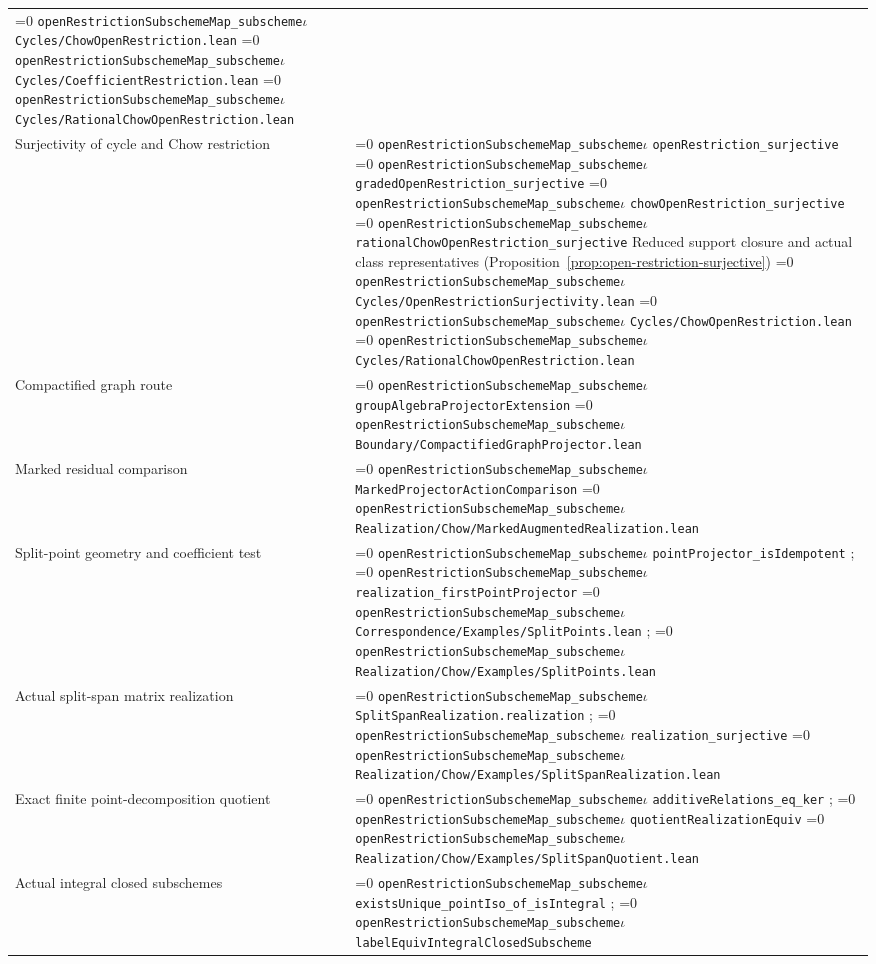 \documentclass[11pt]{article}
\theoremstyle{definition}
\theoremstyle{remark}
\newcommand{\leanpath}[1]{%
  \ifnum\pdfstrcmp{\detokenize{#1}}%
      {\detokenize{openRestrictionSubschemeMap_subschemeι}}=0
    \texttt{\nolinkurl{openRestrictionSubschemeMap_subscheme}}\ensuremath{\iota}%
  \else
    \texttt{\nolinkurl{#1}}%
  \fi}
\begin{document}
\begin{longtable}{@{}>{\raggedright\arraybackslash}p{}
                >{\raggedright\arraybackslash}p{}@{}}
\leanpath{Cycles/ChowOpenRestriction.lean}\newline
\leanpath{Cycles/CoefficientRestriction.lean}\newline
\leanpath{Cycles/RationalChowOpenRestriction.lean}\\
Surjectivity of cycle and Chow restriction &
\leanpath{openRestriction_surjective}\newline
\leanpath{gradedOpenRestriction_surjective}\newline
\leanpath{chowOpenRestriction_surjective}\newline
\leanpath{rationalChowOpenRestriction_surjective}\newline
Reduced support closure and actual class representatives
(Proposition~\ref{prop:open-restriction-surjective})\newline
\leanpath{Cycles/OpenRestrictionSurjectivity.lean}\newline
\leanpath{Cycles/ChowOpenRestriction.lean}\newline
\leanpath{Cycles/RationalChowOpenRestriction.lean}\\
Compactified graph route &
\leanpath{groupAlgebraProjectorExtension}\newline
\leanpath{Boundary/CompactifiedGraphProjector.lean}\\
Marked residual comparison &
\leanpath{MarkedProjectorActionComparison}\newline
\leanpath{Realization/Chow/MarkedAugmentedRealization.lean}\\
Split-point geometry and coefficient test &
\leanpath{pointProjector_isIdempotent};
\leanpath{realization_firstPointProjector}\newline
\leanpath{Correspondence/Examples/SplitPoints.lean};
\leanpath{Realization/Chow/Examples/SplitPoints.lean}\\
Actual split-span matrix realization &
\leanpath{SplitSpanRealization.realization};
\leanpath{realization_surjective}\newline
\leanpath{Realization/Chow/Examples/SplitSpanRealization.lean}\\
Exact finite point-decomposition quotient &
\leanpath{additiveRelations_eq_ker};
\leanpath{quotientRealizationEquiv}\newline
\leanpath{Realization/Chow/Examples/SplitSpanQuotient.lean}\\
Actual integral closed subschemes &
\leanpath{existsUnique_pointIso_of_isIntegral};
\leanpath{labelEquivIntegralClosedSubscheme}\newline

\end{longtable}
\end{document}
